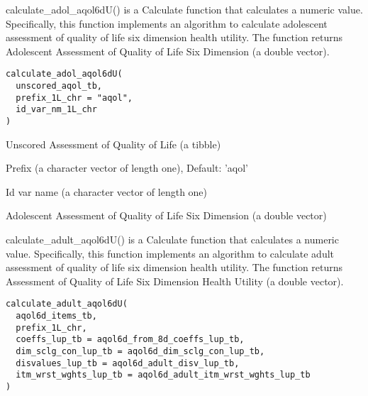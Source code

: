 \documentclass[a4paper]{book}
\begin{document}
%
\begin{Description}\relax
calculate\_adol\_aqol6dU() is a Calculate function that calculates a numeric value. Specifically, this function implements an algorithm to calculate adolescent assessment of quality of life six dimension health utility. The function returns Adolescent Assessment of Quality of Life Six Dimension (a double vector).
\end{Description}
%
\begin{Usage}
\begin{verbatim}
calculate_adol_aqol6dU(
  unscored_aqol_tb,
  prefix_1L_chr = "aqol",
  id_var_nm_1L_chr
)
\end{verbatim}
\end{Usage}
%
\begin{Arguments}
\begin{ldescription}
\item[\code{unscored\_aqol\_tb}] Unscored Assessment of Quality of Life (a tibble)

\item[\code{prefix\_1L\_chr}] Prefix (a character vector of length one), Default: 'aqol'

\item[\code{id\_var\_nm\_1L\_chr}] Id var name (a character vector of length one)
\end{ldescription}
\end{Arguments}
%
\begin{Value}
Adolescent Assessment of Quality of Life Six Dimension (a double vector)
\end{Value}
%
\begin{Description}\relax
calculate\_adult\_aqol6dU() is a Calculate function that calculates a numeric value. Specifically, this function implements an algorithm to calculate adult assessment of quality of life six dimension health utility. The function returns Assessment of Quality of Life Six Dimension Health Utility (a double vector).
\end{Description}
%
\begin{Usage}
\begin{verbatim}
calculate_adult_aqol6dU(
  aqol6d_items_tb,
  prefix_1L_chr,
  coeffs_lup_tb = aqol6d_from_8d_coeffs_lup_tb,
  dim_sclg_con_lup_tb = aqol6d_dim_sclg_con_lup_tb,
  disvalues_lup_tb = aqol6d_adult_disv_lup_tb,
  itm_wrst_wghts_lup_tb = aqol6d_adult_itm_wrst_wghts_lup_tb
)
\end{verbatim}
\end{Usage}
\end{document}

